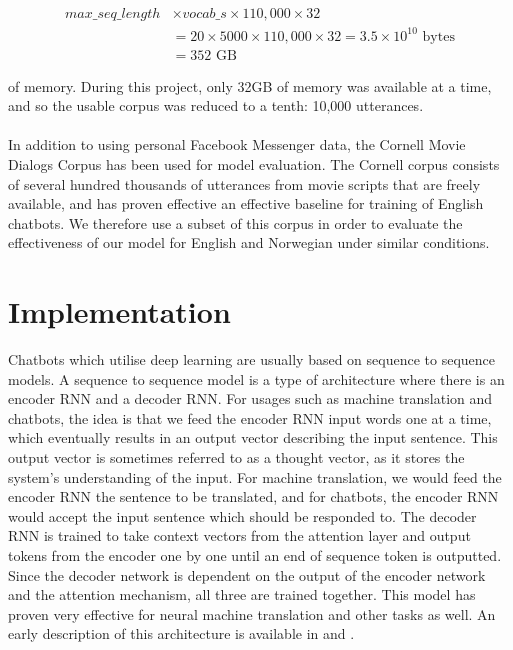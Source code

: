 \documentclass{article}
\begin{document}
\begin{align*}
  max\_seq\_length &\times vocab\_s \times 110,000 \times 32 \\
  &= 20 \times 5000 \times 110,000 \times 32 = 3.5 \times 10^{10} \text{ bytes}\\
  &= 352 \text{ GB}
\end{align*}

of memory. During this project, only 32GB of memory was available at a
time, and so the usable corpus was reduced to a tenth: 10,000 utterances.

\paragraph{}
In addition to using personal Facebook Messenger data, the Cornell Movie
Dialogs Corpus \cite{cornell-corpus} has been used for model evaluation.
The Cornell corpus consists of several hundred thousands of utterances
from movie scripts that are freely available, and has proven effective
an effective baseline for training of English chatbots. We therefore use
a subset of this corpus in order to evaluate the effectiveness of our model
for English and Norwegian under similar conditions.

\section*{Implementation}
Chatbots which utilise deep learning are usually based on sequence to sequence
models. A sequence to sequence model is a type of architecture where there is
an encoder RNN and a decoder RNN. For usages such as machine translation and
chatbots, the idea is that we feed the encoder RNN input words one at a time,
which eventually results in an output vector describing the input sentence.
This output vector is sometimes referred to as a thought vector, as it stores
the system's understanding of the input. For machine translation, we would feed
the encoder RNN the sentence to be translated, and for chatbots, the encoder
RNN would accept the input sentence which should be responded to. The decoder
RNN is trained to take context vectors from the attention layer and output
tokens from the encoder one by one until an end of sequence token is outputted.
Since the decoder network is dependent on the output of the encoder network and
the attention mechanism, all three are trained together. This model has proven
very effective for neural machine translation and other tasks as well. An early
description of this architecture is available in \cite{Cho2014} and
\cite{Bahdanau2015}.
\end{document}
